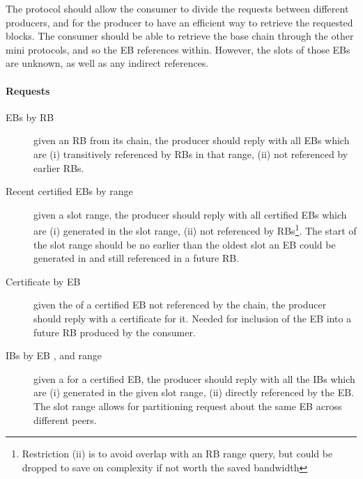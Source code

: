 The protocol should allow the consumer to divide the requests between
different producers, and for the producer to have an efficient way to
retrieve the requested blocks.
%
The consumer should be able to retrieve the base chain through the
other mini protocols, and so the EB references within. However, the
slots of those EBs are unknown, as well as any indirect references.

\paragraph{Requests}
\begin{description}
\item[EBs by RB \rbrange{}] given an RB \rbrange{} from its chain, the producer
  should reply with all EBs which are (i) transitively referenced by RBs in that
  range, (ii) not referenced by earlier RBs.
\item[Recent certified EBs by \slot{} range]\label{catchup:req:recent-ebs} given a slot range, the
  producer should reply with all certified EBs which are (i) generated
  in the slot range, (ii) not referenced by RBs\footnote{Restriction
  (ii) is to avoid overlap with an RB range query, but could be dropped to save on complexity if not worth the saved bandwidth}. The start of the
  slot range should be no earlier than the oldest slot an EB could be
  generated in and still referenced in a future RB.
\item[Certificate by EB \point{}] given the \point{} of a certified EB not referenced by the chain, the producer should reply with a certificate for it. Needed for inclusion of the EB into a future RB produced by the consumer.
\item[IBs by EB \point{}, and \slot{} range] given a \point{} for a
  certified EB, the producer should reply with all the IBs which are (i)
  generated in the given slot range, (ii) directly referenced by
  the EB. The slot range allows for partitioning request about the
  same EB across different peers.
\end{description}

